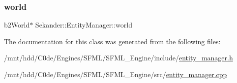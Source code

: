 \mbox{\label{classSekander_1_1EntityManager_ad2d38ab329ff4b57b2d66b807dacdbb3}} 
\subsubsection{\texorpdfstring{world}{world}}
{\footnotesize\ttfamily b2\+World$\ast$ Sekander\+::\+Entity\+Manager\+::world\hspace{0.3cm}{\ttfamily [private]}}



The documentation for this class was generated from the following files\+:\begin{DoxyCompactItemize}
\item 
/mnt/hdd/\+C0de/\+Engines/\+S\+F\+M\+L/\+S\+F\+M\+L\+\_\+\+Engine/include/\hyperlink{entity__manager_8h}{entity\+\_\+manager.\+h}\item 
/mnt/hdd/\+C0de/\+Engines/\+S\+F\+M\+L/\+S\+F\+M\+L\+\_\+\+Engine/src/\hyperlink{entity__manager_8cpp}{entity\+\_\+manager.\+cpp}\end{DoxyCompactItemize}
